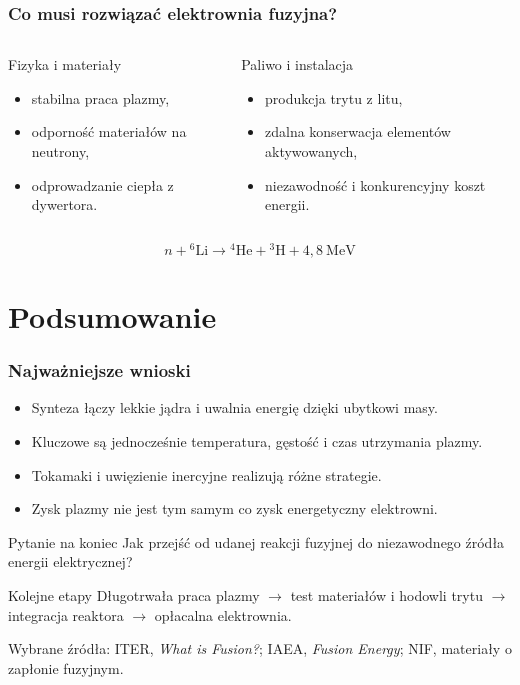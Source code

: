 \documentclass[aspectratio=169,11pt]{beamer}
\begin{document}
\begin{frame}
  \frametitle{Co musi rozwiązać elektrownia fuzyjna?}
  \begin{columns}[T,onlytextwidth]
      \begin{block}{Fizyka i materiały}
        \begin{itemize}
          \item stabilna praca plazmy,
          \item odporność materiałów na neutrony,
          \item odprowadzanie ciepła z dywertora.
        \end{itemize}
      \end{block}
      \begin{block}{Paliwo i instalacja}
        \begin{itemize}
          \item produkcja trytu z litu,
          \item zdalna konserwacja elementów aktywowanych,
          \item niezawodność i konkurencyjny koszt energii.
        \end{itemize}
      \end{block}
  \end{columns}
  \[
    n+{}^6\mathrm{Li}\rightarrow{}^4\mathrm{He}+{}^3\mathrm{H}
    +4{,}8~\mathrm{MeV}
  \]
\end{frame}

\section{Podsumowanie}
\begin{frame}
  \frametitle{Najważniejsze wnioski}
  \begin{itemize}
    \item Synteza łączy lekkie jądra i uwalnia energię dzięki ubytkowi masy.
    \item Kluczowe są jednocześnie temperatura, gęstość i czas utrzymania
      plazmy.
    \item Tokamaki i uwięzienie inercyjne realizują różne strategie.
    \item Zysk plazmy nie jest tym samym co zysk energetyczny elektrowni.
  \end{itemize}
  \begin{block}{Pytanie na koniec}
    Jak przejść od udanej reakcji fuzyjnej do niezawodnego źródła energii
    elektrycznej?
  \end{block}
  \begin{exampleblock}{Kolejne etapy}
    Długotrwała praca plazmy \(\rightarrow\) test materiałów i hodowli trytu
    \(\rightarrow\) integracja reaktora \(\rightarrow\) opłacalna elektrownia.
  \end{exampleblock}
  {\footnotesize
  Wybrane źródła: ITER, \emph{What is Fusion?}; IAEA,
  \emph{Fusion Energy}; NIF, materiały o zapłonie fuzyjnym.}
\end{frame}
\end{document}
